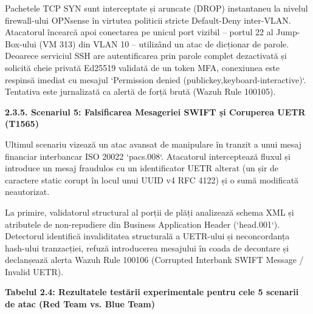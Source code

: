 \documentclass[
]{article}
\begin{document}
Pachetele TCP SYN sunt interceptate și aruncate (DROP) instantaneu la
nivelul firewall-ului OPNsense în virtutea politicii stricte
Default-Deny inter-VLAN. Atacatorul încearcă apoi conectarea pe unicul
port vizibil -- portul 22 al Jump-Box-ului (VM 313) din VLAN 10 --
utilizând un atac de dicționar de parole. Deoarece serviciul SSH are
autentificarea prin parole complet dezactivată și solicită cheie privată
Ed25519 validată de un token MFA, conexiunea este respinsă imediat cu
mesajul `Permission denied (publickey,keyboard-interactive)`. Tentativa
este jurnalizată ca alertă de forță brută (Wazuh Rule 100105).

\textbf{2.3.5. Scenariul 5: Falsificarea Mesageriei SWIFT și Coruperea
UETR (T1565)}

Ultimul scenariu vizează un atac avansat de manipulare în tranzit a unui
mesaj financiar interbancar ISO 20022 `pacs.008`. Atacatorul
interceptează fluxul și introduce un mesaj fraudulos cu un identificator
UETR alterat (un șir de caractere static corupt în locul unui UUID v4
RFC 4122) și o sumă modificată neautorizat.

La primire, validatorul structural al porții de plăți analizează schema
XML și atributele de non-repudiere din Business Application Header
(`head.001`). Detectorul identifică invaliditatea structurală a
UETR-ului și neconcordanța hash-ului tranzacției, refuză introducerea
mesajului în coada de decontare și declanșează alerta Wazuh Rule 100106
(Corrupted Interbank SWIFT Message / Invalid UETR).

\textbf{Tabelul 2.4: Rezultatele testării experimentale pentru cele 5
scenarii de atac (Red Team vs. Blue Team)}
\end{document}
